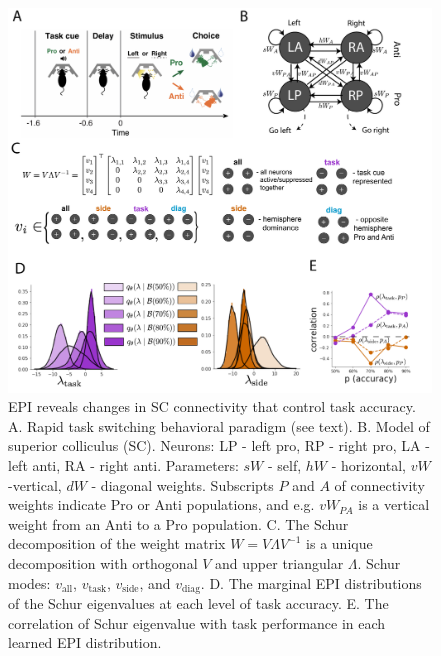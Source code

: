 \documentclass[11pt]{article}
\begin{document}
\begin{figure}
\begin{center}
\includegraphics[scale=0.5]{figures/fig4/fig4.pdf}
\end{center}
\caption{EPI reveals changes in SC \cite{duan2018collicular} connectivity that control task accuracy.  A. Rapid task switching behavioral paradigm (see text). B. Model of superior colliculus (SC). Neurons: LP - left pro, RP - right pro, LA - left anti, RA - right anti.  Parameters: $sW$ - self, $hW$ - horizontal, $vW$ -vertical, $dW$ - diagonal weights.  Subscripts $P$ and $A$ of connectivity weights indicate Pro or Anti populations, and e.g. $vW_{PA}$ is a vertical weight from an Anti to a Pro population.  C. The Schur decomposition of the weight matrix $W = V\Lambda V^{-1}$ is a unique decomposition with orthogonal $V$ and upper triangular $\Lambda$. Schur modes: $v_{\text{all}}$, $v_{\text{task}}$, $v_{\text{side}}$, and $v_{\text{diag}}$.  D. The marginal EPI distributions of the Schur eigenvalues at each level of task accuracy. E. The correlation of Schur eigenvalue with task performance in each learned EPI distribution.}
\label{fig:SC}
\end{figure}
\end{document}
